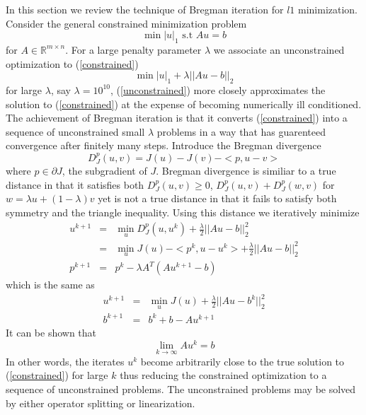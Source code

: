 \documentclass[10pt]{amsart}
\newcommand{\R}{\mathbb{R}}
\theoremstyle{remark}
\begin{document}
In this section we review the technique of Bregman iteration for $l1$ minimization. Consider the general constrained minimization problem
\begin{equation}\label{constrained}
\min |u|_1 \text{ s.t } Au=b
\end{equation}
for $A\in \R^{m \times n}$. For a large penalty parameter $\lambda$ we associate an unconstrained optimization to (\ref{constrained})
\begin{equation}\label{unconstrained}
\min |u|_1 + \lambda ||Au-b||_2
\end{equation}
for large $\lambda$, say $\lambda = 10^{10}$, (\ref{unconstrained}) more closely approximates the solution to (\ref{constrained}) at the expense of becoming numerically ill conditioned. The achievement of Bregman iteration is that it converts (\ref{constrained}) into a sequence of unconstrained small $\lambda$ problems in a way that has guarenteed convergence after finitely many steps. Introduce the Bregman divergence
\begin{equation}
D_{J}^p(u,v) = J(u) - J(v)- <p,u-v>
\end{equation}
where $p\in \partial J$, the subgradient of $J$. Bregman divergence is similiar to a true distance in that it satisfies both $D_J^p(u,v) \geq 0$, $D_J^p(u,v) + D_J^p(w,v)$ for $w = \lambda u + (1-\lambda)v$ yet is not a true distance in that it fails to satisfy both symmetry and the triangle inequality. Using this distance we iteratively minimize
\begin{eqnarray}
u^{k+1} &=& \min_u D_J^p(u,u^k) + \frac{\lambda}{2}||Au - b||_2^2 \\
&=& \min_u J(u) - <p^k, u-u^k> +  \frac{\lambda}{2}||Au - b||_2^2 \\
p^{k+1} &=& p^k - \lambda A^T (Au^{k+1} - b)
\end{eqnarray}
which is the same as
\begin{eqnarray}
u^{k+1} &=& \min_u J(u) + \frac{\lambda}{2}||Au - b^k||_2^2 \\
b^{k+1} &=& b^k + b -Au^{k+1}
\end{eqnarray}
It can be shown \cite{Osher2005} that
\begin{equation}
\lim_{k\rightarrow \infty} A u^k = b
\end{equation}
In other words, the iterates $u^k$ become arbitrarily close to the true solution to (\ref{constrained}) for large $k$ thus reducing the constrained optimization to a sequence of unconstrained problems. The unconstrained problems may be solved by either operator splitting or linearization.
\end{document}
